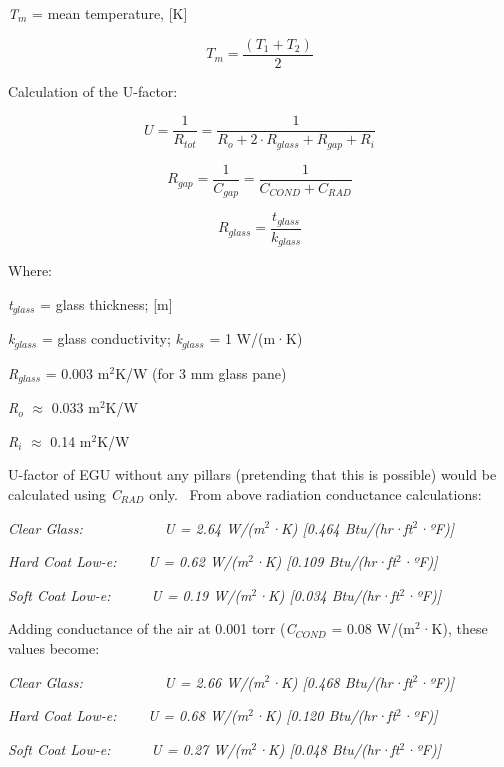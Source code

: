 \emph{T\(_{m}\)} = mean temperature, {[}K{]}

\begin{equation}
{T_m} = \frac{{\left( {{T_1} + {T_2}} \right)}}{2}
\end{equation}

Calculation of the U-factor:

\begin{equation}
U = \frac{1}{{{R_{tot}}}} = \frac{1}{{{R_o} + 2 \cdot {R_{glass}} + {R_{gap}} + {R_i}}}
\end{equation}

\begin{equation}
{R_{gap}} = \frac{1}{{{C_{gap}}}} = \frac{1}{{{C_{COND}} + {C_{RAD}}}}
\end{equation}

\begin{equation}
{R_{glass}} = \frac{{{t_{glass}}}}{{{k_{glass}}}}
\end{equation}

Where:

\emph{t}\(_{glass}\) = glass thickness; {[}m{]}

\emph{k}\(_{glass}\) = glass conductivity; \emph{k}\(_{glass}\) = 1 W/(m·K)

\emph{R}\(_{glass}\) = 0.003 m\(^{2}\)K/W (for 3 mm glass pane)

\emph{R}\(_{o}\) $\approx$ 0.033 m\(^{2}\)K/W

\emph{R}\(_{i}\) $\approx$ 0.14 m\(^{2}\)K/W

U-factor of EGU without any pillars (pretending that this is possible) would be calculated using \emph{C}\(_{RAD}\) only.~ From above radiation conductance calculations:

\emph{Clear Glass: ~~~~~~~~~~ U = 2.64 W/(m\(^{2}\)·K) {[}0.464 Btu/(hr·ft\(^{2}\)·ºF){]}}

\emph{Hard Coat Low-e: ~~~ U = 0.62 W/(m\(^{2}\)·K) {[}0.109 Btu/(hr·ft\(^{2}\)·ºF){]}}

\emph{Soft Coat Low-e:~~~~~ U = 0.19 W/(m\(^{2}\)·K) {[}0.034 Btu/(hr·ft\(^{2}\)·ºF){]}}

Adding conductance of the air at 0.001 torr (\emph{C}\(_{COND}\) = 0.08 W/(m\(^{2}\)·K), these values become:

\emph{Clear Glass: ~~~~~~~~~~ U = 2.66 W/(m\(^{2}\)·K) {[}0.468 Btu/(hr·ft\(^{2}\)·ºF){]}}

\emph{Hard Coat Low-e: ~~~ U = 0.68 W/(m\(^{2}\)·K) {[}0.120 Btu/(hr·ft\(^{2}\)·ºF){]}}

\emph{Soft Coat Low-e:~~~~~ U = 0.27 W/(m\(^{2}\)·K) {[}0.048 Btu/(hr·ft\(^{2}\)·ºF){]}}

